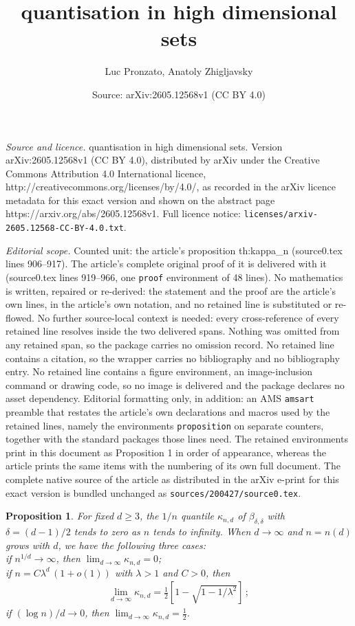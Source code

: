 \documentclass[10pt,a4paper]{amsart}
\title{quantisation in high dimensional sets}
\author{Luc Pronzato, Anatoly Zhigljavsky}
\date{Source: arXiv:2605.12568v1 (CC BY 4.0)}
\newtheorem{proposition}{Proposition}
\newcommand{\be}{\begin{eqnarray}}
\newcommand{\ee}{\end{eqnarray}}
\def\ml{\lambda}
\begin{document}
\maketitle

\noindent\emph{Source and licence.} quantisation in high dimensional sets. Version arXiv:2605.12568v1 (CC BY 4.0), distributed by arXiv under the Creative Commons Attribution 4.0 International licence, http://creativecommons.org/licenses/by/4.0/, as recorded in the arXiv licence metadata for this exact version and shown on the abstract page https://arxiv.org/abs/2605.12568v1. Full licence notice: \texttt{licenses/arxiv-2605.12568-CC-BY-4.0.txt}.\par\smallskip

\noindent\textit{Editorial scope.} Counted unit: the article's proposition th:kappa\_n (source0.tex lines 906--917). The article's complete original proof of it is delivered with it (source0.tex lines 919--966, one \texttt{proof} environment of 48 lines). No mathematics is written, repaired or re-derived: the statement and the proof are the article's own lines, in the article's own notation, and no retained line is substituted or re-flowed.  No further source-local context is needed: every cross-reference of every retained line resolves inside the two delivered spans.  Nothing was omitted from any retained span, so the package carries no omission record.  No retained line contains a citation, so the wrapper carries no bibliography and no bibliography entry.  No retained line contains a figure environment, an image-inclusion command or drawing code, so no image is delivered and the package declares no asset dependency.  Editorial formatting only, in addition: an AMS \texttt{amsart} preamble that restates the article's own declarations and macros used by the retained lines, namely the environments \texttt{proposition} on separate counters, together with the standard packages those lines need.  The retained environments print in this document as Proposition 1 in order of appearance, whereas the article prints the same items with the numbering of its own full document.  The complete native source of the article as distributed in the arXiv e-print for this exact version is bundled unchanged as \texttt{sources/200427/source0.tex}.
\begin{proposition} \label{th:kappa_n}
For fixed $d\geq 3$, the $1/n$ quantile $\kappa_{n,d}$ of  $\beta_{\delta,\delta}$ with $\delta=(d-1)/2$ tends to zero as $n$ tends to infinity. When $d \to \infty$ and $n=n(d)$ grows with $d$, we have the following three cases:\\
 if $n^{1/d}\to\infty$, then $\lim_{d\to\infty} \kappa_{n,d} = 0$;\\
 if $n=C\ml^d\,(1+o(1))$ with $\ml>1$ and $C>0$, then
\be \label{asymptotic-kappa} \lim_{d\to\infty} \kappa_{n,d} = \frac12 \left[1-\sqrt{1-1/\ml^2}\right]\, ;
\ee
{} %
if $(\log n)/d \to 0$, then $\lim_{d\to\infty} \kappa_{n,d} = \frac12$.
\end{proposition}
\end{document}
